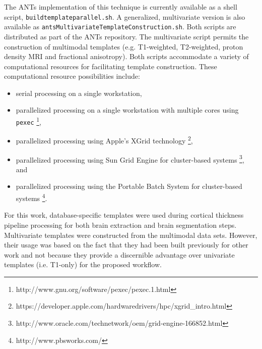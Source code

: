 The ANTs implementation of this technique is currently available as a shell script, 
\verb#buildtemplateparallel.sh#.  A generalized, multivariate version is also available as
\verb#antsMultivariateTemplateConstruction.sh#.  Both scripts are distributed as part of
 the ANTs repository.
The multivariate script permits the construction of multimodal templates (e.g. 
T1-weighted, T2-weighted, proton density MRI and fractional anisotropy).  
Both scripts accommodate a variety of computational resources
for facilitating template construction.  These computational resource possibilities include:
\begin{itemize}
  \item serial processing on a single workstation, 
  \item parallelized processing on a single workstation with multiple cores using \verb#pexec#%
  \footnote{http://www.gnu.org/software/pexec/pexec.1.html},
  \item parallelized processing using Apple's XGrid technology%
  \footnote{https://developer.apple.com/hardwaredrivers/hpc/xgrid\_intro.html}, 
  \item parallelized processing using Sun Grid Engine for cluster-based systems%
  \footnote{http://www.oracle.com/technetwork/oem/grid-engine-166852.html}, and 
  \item parallelized processing using the Portable Batch System for cluster-based systems%
  \footnote{http://www.pbsworks.com/}.
\end{itemize}

For this work, database-specific templates were used during cortical thickness pipeline
processing for both brain extraction and brain segmentation steps.  Multivariate templates 
were constructed from the multimodal data sets.  However, their usage was based on the 
fact that they had been built previously for other work and not because they provide a 
discernible advantage over univariate templates (i.e. T1-only) for the proposed workflow.

